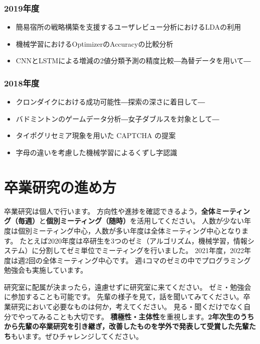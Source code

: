 \documentclass[uplatex,jis2004,a4paper,11pt]{jsarticle}
\renewcommand{\emph}[1]{\textbf{#1}}
\begin{document}
\begin{multicols}{2}
{\subsubsection*{2019年度}
\begin{itemize}
  \item 簡易宿所の戦略構築を支援するユーザレビュー分析におけるLDAの利用
  \item 機械学習におけるOptimizerのAccuracyの比較分析
  \item CNNとLSTMによる増減の2値分類予測の精度比較―為替データを用いて― 
\end{itemize}
\vspace{-5mm}
\subsubsection*{2018年度}
\begin{itemize}
  \item クロンダイクにおける成功可能性―探索の深さに着目して―
  \item バドミントンのゲームデータ分析―女子ダブルスを対象として―
  \item タイポグリセミア現象を用いた CAPTCHA の提案
  \item 字母の違いを考慮した機械学習によるくずし字認識
\end{itemize}
\vspace{-.4cm}
}
\end{multicols}

\clearpage
\section{卒業研究の進め方}

卒業研究は個人で行います。
方向性や進捗を確認できるよう，\emph{全体ミーティング（毎週）}と\emph{個別ミーティング（随時）}を活用してください。
人数が少ない年度は個別ミーティング中心，人数が多い年度は全体ミーティング中心となります。
たとえば2020年度は卒研生を3つのゼミ（アルゴリズム，機械学習，情報システム）に分割してゼミ単位でミーティングを行いました。
2021年度，2022年度は週2回の全体ミーティング中心です。
週4コマのゼミの中でプログラミング勉強会も実施しています。

研究室に配属が決まったら，遠慮せずに研究室に来てください。
ゼミ・勉強会に参加することも可能です。
先輩の様子を見て，話を聞いてみてください。卒業研究において必要なものは何か，考えてください。
見る・聞くだけでなく自分でやってみることも大切です。
\emph{積極性・主体性}を重視します。\emph{2年次生のうちから先輩の卒業研究を引き継ぎ，改善したものを学外で発表して受賞した先輩たち}もいます。ぜひチャレンジしてください。
\vspace{-.3cm}
\end{document}
